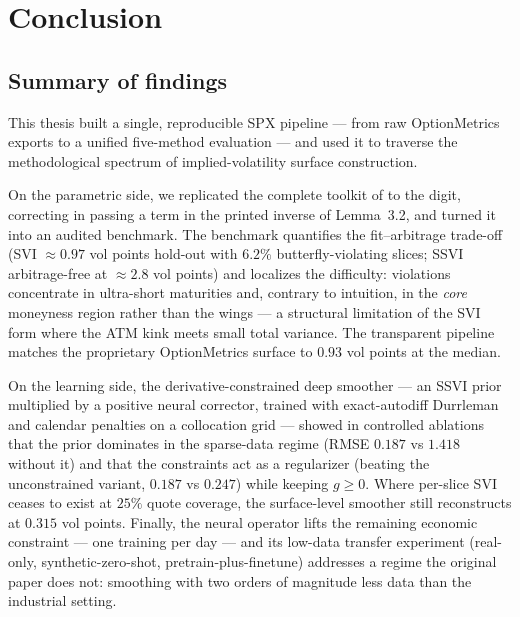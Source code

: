 \chapter{Conclusion}
\label{ch:conclusion}

\section{Summary of findings}
This thesis built a single, reproducible SPX pipeline --- from raw
OptionMetrics exports to a unified five-method evaluation --- and used it to
traverse the methodological spectrum of implied-volatility surface
construction.

On the parametric side, we replicated the complete toolkit of
\cite{gatheral2014arbitrage} to the digit, correcting in passing a term in
the printed inverse of Lemma~3.2, and turned it into an audited benchmark.
The benchmark quantifies the fit--arbitrage trade-off (SVI $\approx0.97$ vol
points hold-out with $6.2\%$ butterfly-violating slices; SSVI arbitrage-free
at $\approx2.8$ vol points) and localizes the difficulty: violations
concentrate in ultra-short maturities and, contrary to intuition, in the
\emph{core} moneyness region rather than the wings --- a structural
limitation of the SVI form where the ATM kink meets small total variance.
The transparent pipeline matches the proprietary OptionMetrics surface to
$0.93$ vol points at the median.

On the learning side, the derivative-constrained deep smoother --- an SSVI
prior multiplied by a positive neural corrector, trained with
exact-autodiff Durrleman and calendar penalties on a collocation grid ---
showed in controlled ablations that the prior dominates in the sparse-data
regime (RMSE $0.187$ vs $1.418$ without it) and that the constraints act as
a regularizer (beating the unconstrained variant, $0.187$ vs $0.247$) while
keeping $g\ge0$. Where per-slice SVI ceases to exist at $25\%$ quote
coverage, the surface-level smoother still reconstructs at $0.315$ vol
points. Finally, the neural operator lifts the remaining economic
constraint --- one training per day --- and its low-data transfer experiment
(real-only, synthetic-zero-shot, pretrain-plus-finetune) addresses a regime
the original paper does not: smoothing with two orders of magnitude less
data than the industrial setting.

